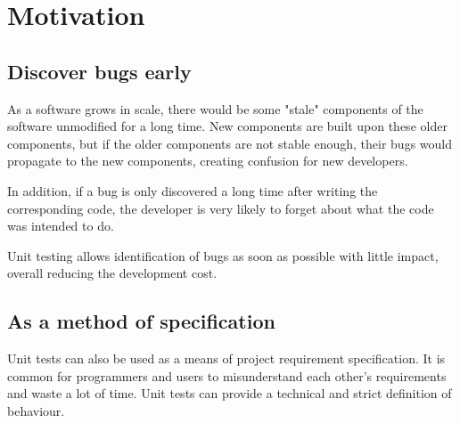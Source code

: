 \section{Motivation}
\subsection{Discover bugs early}
As a software grows in scale, there would be some "stale" components of the software unmodified for a long time.
New components are built upon these older components, but if the older components are not stable enough,
their bugs would propagate to the new components, creating confusion for new developers.

In addition, if a bug is only discovered a long time after writing the corresponding code,
the developer is very likely to forget about what the code was intended to do.

Unit testing allows identification of bugs as soon as possible with little impact, overall reducing the development cost.

\subsection{As a method of specification}
Unit tests can also be used as a means of project requirement specification.
It is common for programmers and users to misunderstand each other's requirements and waste a lot of time.
Unit tests can provide a technical and strict definition of behaviour.
